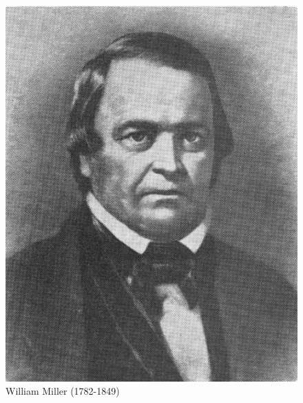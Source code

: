 \begin{figure}[hp]
    \centering
    \includegraphics[width=1\linewidth]{images/william-miller.jpg}
    \caption*{William Miller (1782-1849)}
    \label{fig:w-miller}
\end{figure}


